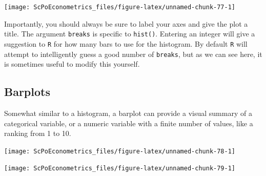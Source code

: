 \documentclass[]{book}
\newenvironment{Shaded}{\begin{snugshade}}{\end{snugshade}}
\newcommand{\DataTypeTok}[1]{\textcolor[rgb]{0.13,0.29,0.53}{#1}}
\newcommand{\KeywordTok}[1]{\textcolor[rgb]{0.13,0.29,0.53}{\textbf{#1}}}
\newcommand{\NormalTok}[1]{#1}
\newcommand{\OperatorTok}[1]{\textcolor[rgb]{0.81,0.36,0.00}{\textbf{#1}}}
\newcommand{\StringTok}[1]{\textcolor[rgb]{0.31,0.60,0.02}{#1}}
\begin{document}
\begin{center}\texttt{[image: ScPoEconometrics\_files/figure-latex/unnamed-chunk-77-1]} \end{center}

Importantly, you should always be sure to label your axes and give the plot a title. The argument \texttt{breaks} is specific to \texttt{hist()}. Entering an integer will give a suggestion to \texttt{R} for how many bars to use for the histogram. By default \texttt{R} will attempt to intelligently guess a good number of \texttt{breaks}, but as we can see here, it is sometimes useful to modify this yourself.

\hypertarget{barplots}{%
\subsection{Barplots}\label{barplots}}

Somewhat similar to a histogram, a barplot can provide a visual summary of a categorical variable, or a numeric variable with a finite number of values, like a ranking from 1 to 10.

\begin{Shaded}
\end{Shaded}

\begin{center}\texttt{[image: ScPoEconometrics\_files/figure-latex/unnamed-chunk-78-1]} \end{center}

\begin{Shaded}
\end{Shaded}

\begin{center}\texttt{[image: ScPoEconometrics\_files/figure-latex/unnamed-chunk-79-1]} \end{center}
\end{document}
